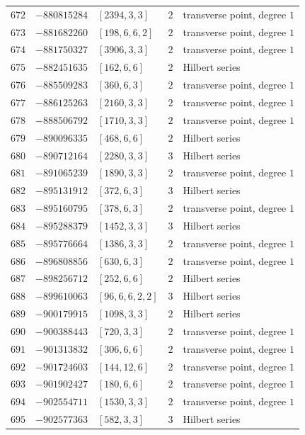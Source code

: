 \documentclass[11pt]{article}
\begin{document}
\begin{center}
\begin{longtable}{r r l c l}
$672$ & $-880815284$ & $[2394,3,3]$ & $2$ & transverse point, degree $1$\\
$673$ & $-881682260$ & $[198,6,6,2]$ & $2$ & transverse point, degree $1$\\
$674$ & $-881750327$ & $[3906,3,3]$ & $2$ & transverse point, degree $1$\\
$675$ & $-882451635$ & $[162,6,6]$ & $2$ & Hilbert series\\
$676$ & $-885509283$ & $[360,6,3]$ & $2$ & transverse point, degree $1$\\
$677$ & $-886125263$ & $[2160,3,3]$ & $2$ & transverse point, degree $1$\\
$678$ & $-888506792$ & $[1710,3,3]$ & $2$ & transverse point, degree $1$\\
$679$ & $-890096335$ & $[468,6,6]$ & $2$ & Hilbert series\\
$680$ & $-890712164$ & $[2280,3,3]$ & $3$ & Hilbert series\\
$681$ & $-891065239$ & $[1890,3,3]$ & $2$ & transverse point, degree $1$\\
$682$ & $-895131912$ & $[372,6,3]$ & $3$ & Hilbert series\\
$683$ & $-895160795$ & $[378,6,3]$ & $2$ & transverse point, degree $1$\\
$684$ & $-895288379$ & $[1452,3,3]$ & $3$ & Hilbert series\\
$685$ & $-895776664$ & $[1386,3,3]$ & $2$ & transverse point, degree $1$\\
$686$ & $-896808856$ & $[630,6,3]$ & $2$ & transverse point, degree $1$\\
$687$ & $-898256712$ & $[252,6,6]$ & $2$ & Hilbert series\\
$688$ & $-899610063$ & $[96,6,6,2,2]$ & $3$ & Hilbert series\\
$689$ & $-900179915$ & $[1098,3,3]$ & $2$ & Hilbert series\\
$690$ & $-900388443$ & $[720,3,3]$ & $2$ & transverse point, degree $1$\\
$691$ & $-901313832$ & $[306,6,6]$ & $2$ & transverse point, degree $1$\\
$692$ & $-901724603$ & $[144,12,6]$ & $2$ & transverse point, degree $1$\\
$693$ & $-901902427$ & $[180,6,6]$ & $2$ & transverse point, degree $1$\\
$694$ & $-902554711$ & $[1530,3,3]$ & $2$ & transverse point, degree $1$\\
$695$ & $-902577363$ & $[582,3,3]$ & $3$ & Hilbert series\\

\end{longtable}
\end{center}
\end{document}
